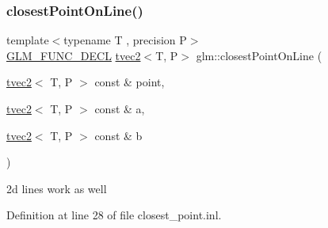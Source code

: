 \subsubsection{\texorpdfstring{closestPointOnLine()}{closestPointOnLine()}\hspace{0.1cm}{\footnotesize\ttfamily [2/2]}}
{\footnotesize\ttfamily template$<$typename T , precision P$>$ \\
\mbox{\hyperlink{setup_8hpp_ab2d052de21a70539923e9bcbf6e83a51}{G\+L\+M\+\_\+\+F\+U\+N\+C\+\_\+\+D\+E\+CL}} \mbox{\hyperlink{structglm_1_1tvec2}{tvec2}}$<$T, P$>$ glm\+::closest\+Point\+On\+Line (\begin{DoxyParamCaption}\item[{\mbox{\hyperlink{structglm_1_1tvec2}{tvec2}}$<$ T, P $>$ const \&}]{point,  }\item[{\mbox{\hyperlink{structglm_1_1tvec2}{tvec2}}$<$ T, P $>$ const \&}]{a,  }\item[{\mbox{\hyperlink{structglm_1_1tvec2}{tvec2}}$<$ T, P $>$ const \&}]{b }\end{DoxyParamCaption})}



2d lines work as well 



Definition at line 28 of file closest\+\_\+point.\+inl.

